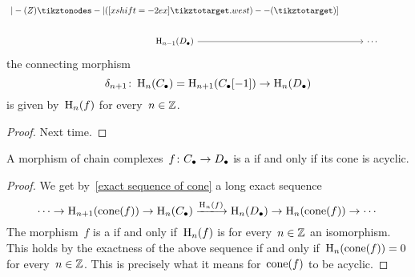 \begin{proposition}
\begin{enumerate}
\[\begin{tikzcd}
{                              |- (Z) \tikztonodes
                              -| ([xshift=-2ex]\tikztotarget.west)
                              -- (\tikztotarget)}
                  ]
          \\
            \Hl_{n-1}(\Dcc)
            \arrow{r}
          & \dotsb
          & {}
        \end{tikzcd}
      \]
      the connecting morphism
      \[
        \delta_{n+1}
        \colon
        \operatorname{H}_n(C_\bullet)
        =
        \operatorname{H}_{n+1}(C_\bullet[-1])
        \to
        \operatorname{H}_n(D_\bullet)
      \]
      is given by~$\operatorname{H}_n(f)$ for every~$n \in \mathbb{Z}$.
  \end{enumerate}
\end{proposition}


\begin{proof}
  Next time.
\end{proof}


\begin{corollary}
  A morphism of chain complexes~$f \colon C_\bullet \to D_\bullet$ is a {\qim} if and only if its cone is acyclic.
\end{corollary}


\begin{proof}
  We get by~\cref{exact sequence of cone} a long exact sequence
  \[
    \dotsb
    \to
    \Hl_{n+1}(\cone(f))
    \to
    \Hl_n(\Ccc)
    \xlongto{\Hl_n(f)}
    \Hl_n(\Dcc)
    \to
    \Hl_n(\cone(f))
    \to
    \dotsb
  \]
  The morphism~$f$ is a {\qim} if and only if~$\operatorname{H}_n(f)$ is for every~$n \in \mathbb{Z}$ an isomorphism.
  This holds by the exactness of the above sequence if and only if~$\operatorname{H}_n(\operatorname{cone}(f)) = 0$ for every~$n \in \mathbb{Z}$.
  This is precisely what it means for~$\operatorname{cone}(f)$ to be acyclic.
\end{proof}









